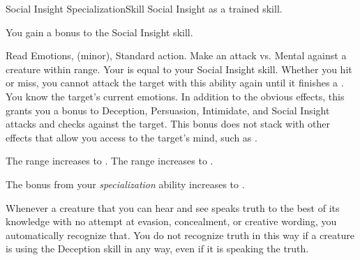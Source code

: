   \begin{feat}{Social Insight Specialization}{Skill}
    \featpre Social Insight as a trained skill.

     You gain a  bonus to the Social Insight skill.

    \begin{sustainability}{Read Emotions}{,  (minor), }
      \abilityusagetime Standard action.
      \rankline
      Make an attack vs. Mental against a creature within \rngshort range.
      Your  is equal to your Social Insight skill.
      Whether you hit or miss, you cannot attack the target with this ability again until it finishes a .
      \hit You know the target's current emotions.
      In addition to the obvious effects, this grants you a  bonus to Deception, Persuasion, Intimidate, and Social Insight attacks and checks against the target.
      This bonus does not stack with other effects that allow you access to the target's mind, such as .

      \rankline
       The range increases to \medrange.
       The range increases to \longrange.
    \end{sustainability}

     The bonus from your \textit{specialization} ability increases to .

     Whenever a creature that you can hear and see speaks truth to the best of its knowledge with no attempt at evasion, concealment, or creative wording, you automatically recognize that.
    You do not recognize truth in this way if a creature is using the Deception skill in any way, even if it is speaking the truth.
  \end{feat}

